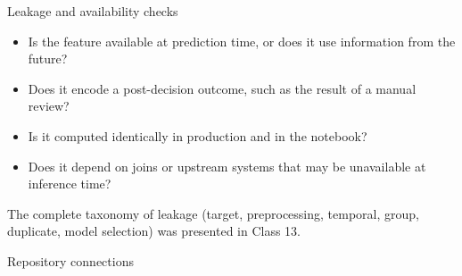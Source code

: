 \begin{frame}{Leakage and availability checks}
\begin{itemize}
\item Is the feature available at prediction time, or does it use information from the future?
\item Does it encode a post-decision outcome, such as the result of a manual review?
\item Is it computed identically in production and in the notebook?
\item Does it depend on joins or upstream systems that may be unavailable at inference time?
\end{itemize}
\vspace{0.3em}
{\footnotesize The complete taxonomy of leakage (target, preprocessing, temporal, group, duplicate, model selection) was presented in Class 13.}
\coursefooter
\end{frame}

\begin{frame}{Repository connections}
\coursefooter
\end{frame}


